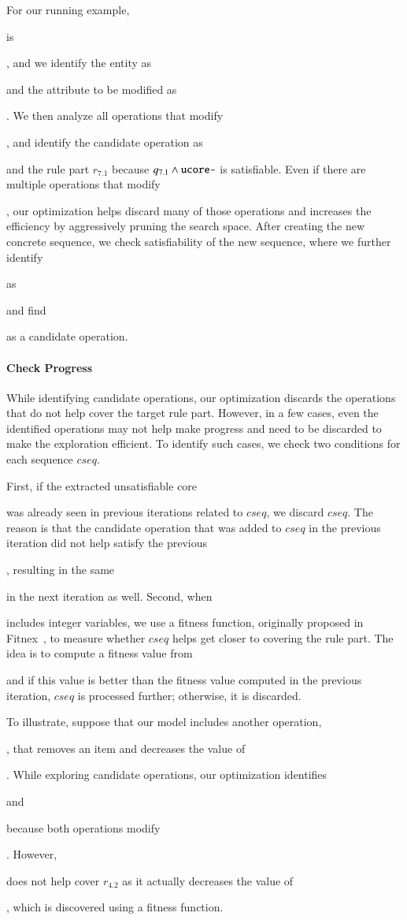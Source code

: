 For our running example, \subject{ucore-} is \subject{ord.total > 0}, and we
identify the entity as \subject{Order} and the attribute to be modified as
\subject{total}. We then analyze all operations that modify
\subject{Order}, and identify the candidate operation as
\subject{AddItemToOrder} and the rule part $r_{7.1}$ because $q_{7.1} \wedge
\subject{ucore-}$ is satisfiable. Even if there are multiple operations that
modify \subject{Order}, our optimization helps discard many of those operations
and increases the efficiency by aggressively pruning the search space.  After
creating the new concrete sequence, we check satisfiability of the new sequence,
where we further identify \subject{ucore} as \subject{cust.crLimit = 0 $\wedge$
  cust.crLimit > 0} and find \subject{AddCreditLimit} as a candidate operation.

\paragraph*{Check Progress} While identifying candidate operations, our
optimization discards the operations that do not help cover the target rule
part. However, in a few cases, even the identified operations may not help make
progress and need to be discarded to make the exploration efficient. To identify
such cases, we check two conditions for each sequence $cseq$.

First, if the extracted unsatisfiable core \subject{ucore} was already seen in
previous iterations related to $cseq$, we discard $cseq$. The reason is that the
candidate operation that was added to $cseq$ in the previous iteration did not
help satisfy the previous \subject{ucore}, resulting in the same \subject{ucore}
in the next iteration as well.  Second, when \subject{ucore} includes integer
variables, we use a fitness function, originally proposed in
Fitnex~\cite{xie09:fitness}, to measure whether $cseq$ helps get closer to
covering the rule part.
The idea is to compute a fitness value from \subject{ucore} and if this value is
better than the fitness value computed in the previous iteration, $cseq$ is
processed further; otherwise, it is discarded.

To illustrate, suppose that our model includes another operation,
\subject{RemoveItemFromOrder}, that removes an item and decreases the value of
\subject{Order.total}. While exploring candidate operations, our optimization
identifies \subject{AddItemToOrder} and \subject{RemoveItemFromOrder} because
both operations modify \subject{total}. However, \subject{RemoveItemFromOrder}
does not help cover $r_{4.2}$ as it actually decreases the value of
\subject{total}, which is discovered using a fitness function.


